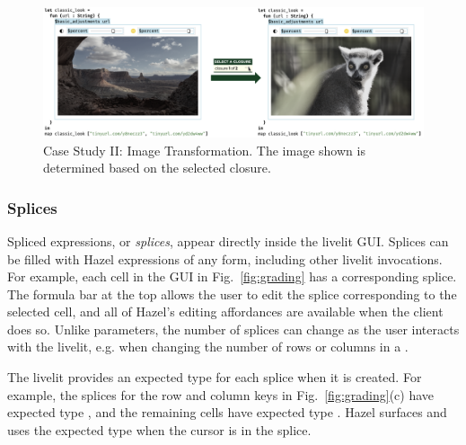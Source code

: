 \begin{figure}
  \begin{center}
    \includegraphics[width=40pc]{img-filter.png}
  \end{center}
  \caption{Case Study II: Image Transformation. The image shown is determined based on the selected closure.}
  \label{fig:img-transformation}
\end{figure}


\subsubsection{Splices}\label{sec:splices}
Spliced expressions, or \emph{splices}, appear directly inside the livelit GUI.
Splices can be filled with Hazel expressions of any form, including other livelit invocations.
For example, each cell in the  GUI in Fig.~\ref{fig:grading}
has a corresponding splice. The formula bar at the top
allows the user to edit the splice corresponding to the selected cell,
and all of Hazel's editing affordances are available when the client does so.
Unlike parameters, the number of splices can change
as the user interacts with the livelit, e.g. when changing the number of rows or columns in a .

The livelit provides an expected type for each splice when it is created.
For example, the splices for the row and column keys in Fig.~\ref{fig:grading}(c) have expected type ,
and the remaining cells have expected type .
Hazel surfaces and uses the expected type when the cursor is in the splice.

